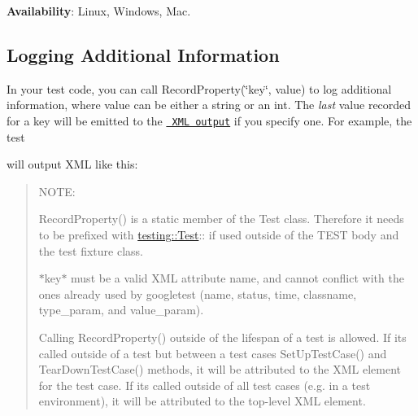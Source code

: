 {\bfseries{Availability}}\+: Linux, Windows, Mac.

\subsection*{Logging Additional Information}

In your test code, you can call {\ttfamily Record\+Property(\char`\"{}key\char`\"{}, value)} to log additional information, where {\ttfamily value} can be either a string or an {\ttfamily int}. The {\itshape last} value recorded for a key will be emitted to the \href{\#generating-an-xml-report}{\texttt{ X\+ML output}} if you specify one. For example, the test


\begin{DoxyCode}{0}
\DoxyCodeLine{\}}
\end{DoxyCode}


will output X\+ML like this\+:


\begin{DoxyCode}{0}
\DoxyCodeLine{  <\textcolor{keywordtype}{testcase} \textcolor{keyword}{name}=\textcolor{stringliteral}{"MinAndMaxWidgets"} \textcolor{keyword}{status}=\textcolor{stringliteral}{"run"} \textcolor{keyword}{time}=\textcolor{stringliteral}{"0.006"} \textcolor{keyword}{classname}=\textcolor{stringliteral}{"WidgetUsageTest"} \textcolor{keyword}{MaximumWidgets}=\textcolor{stringliteral}{"12"} \textcolor{keyword}{MinimumWidgets}=\textcolor{stringliteral}{"9"} />}
\end{DoxyCode}


\begin{quote}
N\+O\+TE\+:


\begin{DoxyItemize}
\item {\ttfamily Record\+Property()} is a static member of the {\ttfamily Test} class. Therefore it needs to be prefixed with {\ttfamily \mbox{\hyperlink{classtesting_1_1Test}{testing\+::\+Test}}\+:\+:} if used outside of the {\ttfamily T\+E\+ST} body and the test fixture class.
\item {\ttfamily $\ast$key$\ast$} must be a valid X\+ML attribute name, and cannot conflict with the ones already used by googletest ({\ttfamily name}, {\ttfamily status}, {\ttfamily time}, {\ttfamily classname}, {\ttfamily type\+\_\+param}, and {\ttfamily value\+\_\+param}).
\item Calling {\ttfamily Record\+Property()} outside of the lifespan of a test is allowed. If it\textquotesingle{}s called outside of a test but between a test case\textquotesingle{}s {\ttfamily Set\+Up\+Test\+Case()} and {\ttfamily Tear\+Down\+Test\+Case()} methods, it will be attributed to the X\+ML element for the test case. If it\textquotesingle{}s called outside of all test cases (e.\+g. in a test environment), it will be attributed to the top-\/level X\+ML element. 
\end{DoxyItemize}\end{quote}



